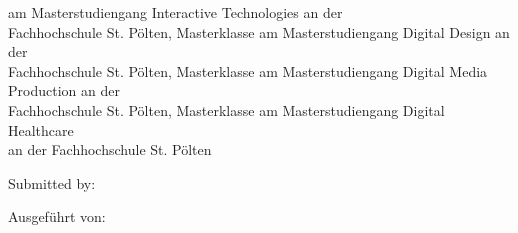 \begin{center}
\ifUseMasterInteractiveTechnologies
	am Masterstudiengang Interactive Technologies an der\\ 
Fachhochschule St. Pölten, Masterklasse \specialization
\else
    \ifUseMasterDigitalDesign
	am Masterstudiengang Digital Design an der\\ 
Fachhochschule St. Pölten, Masterklasse \specialization
\else
    \ifUseMasterDigitalMediaProduction
	am Masterstudiengang Digital Media Production an der\\ 
Fachhochschule St. Pölten, Masterklasse \specialization
\else
	\ifUseMasterDigitalHealthCare
		am Masterstudiengang Digital Healthcare\\ 
an der Fachhochschule St. Pölten
    \else
        
  	\fi\fi\fi\fi

\vspace{1cm}
\ifUseBachelorMediaTechnologiesOne
	Submitted by:
    
\else
	Ausgeführt von:\\ 
\fi
\fontsize{15pt}{15pt}\selectfont
\textbf{\studentFirstName\ \studentLastName} \\
\fontsize{11pt}{15pt}\selectfont
\studentId


\end{center}

